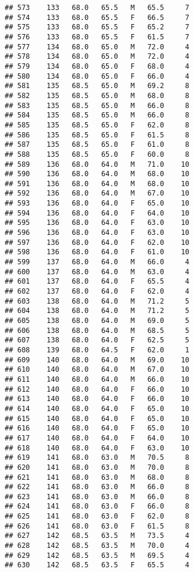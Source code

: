 \documentclass[
]{article}
\begin{document}
\begin{verbatim}
## 573    133   68.0   65.5   M   65.5     7
## 574    133   68.0   65.5   F   66.5     7
## 575    133   68.0   65.5   F   65.2     7
## 576    133   68.0   65.5   F   61.5     7
## 577    134   68.0   65.0   M   72.0     4
## 578    134   68.0   65.0   M   72.0     4
## 579    134   68.0   65.0   F   68.0     4
## 580    134   68.0   65.0   F   66.0     4
## 581    135   68.5   65.0   M   69.2     8
## 582    135   68.5   65.0   M   68.0     8
## 583    135   68.5   65.0   M   66.0     8
## 584    135   68.5   65.0   M   66.0     8
## 585    135   68.5   65.0   F   62.0     8
## 586    135   68.5   65.0   F   61.5     8
## 587    135   68.5   65.0   F   61.0     8
## 588    135   68.5   65.0   F   60.0     8
## 589    136   68.0   64.0   M   71.0    10
## 590    136   68.0   64.0   M   68.0    10
## 591    136   68.0   64.0   M   68.0    10
## 592    136   68.0   64.0   M   67.0    10
## 593    136   68.0   64.0   F   65.0    10
## 594    136   68.0   64.0   F   64.0    10
## 595    136   68.0   64.0   F   63.0    10
## 596    136   68.0   64.0   F   63.0    10
## 597    136   68.0   64.0   F   62.0    10
## 598    136   68.0   64.0   F   61.0    10
## 599    137   68.0   64.0   M   66.0     4
## 600    137   68.0   64.0   M   63.0     4
## 601    137   68.0   64.0   F   65.5     4
## 602    137   68.0   64.0   F   62.0     4
## 603    138   68.0   64.0   M   71.2     5
## 604    138   68.0   64.0   M   71.2     5
## 605    138   68.0   64.0   M   69.0     5
## 606    138   68.0   64.0   M   68.5     5
## 607    138   68.0   64.0   F   62.5     5
## 608    139   68.0   64.5   F   62.0     1
## 609    140   68.0   64.0   M   69.0    10
## 610    140   68.0   64.0   M   67.0    10
## 611    140   68.0   64.0   M   66.0    10
## 612    140   68.0   64.0   F   66.0    10
## 613    140   68.0   64.0   F   66.0    10
## 614    140   68.0   64.0   F   65.0    10
## 615    140   68.0   64.0   F   65.0    10
## 616    140   68.0   64.0   F   65.0    10
## 617    140   68.0   64.0   F   64.0    10
## 618    140   68.0   64.0   F   63.0    10
## 619    141   68.0   63.0   M   70.5     8
## 620    141   68.0   63.0   M   70.0     8
## 621    141   68.0   63.0   M   68.0     8
## 622    141   68.0   63.0   M   66.0     8
## 623    141   68.0   63.0   M   66.0     8
## 624    141   68.0   63.0   F   66.0     8
## 625    141   68.0   63.0   F   62.0     8
## 626    141   68.0   63.0   F   61.5     8
## 627    142   68.5   63.5   M   73.5     4
## 628    142   68.5   63.5   M   70.0     4
## 629    142   68.5   63.5   M   69.5     4
## 630    142   68.5   63.5   F   65.5     4

\end{verbatim}
\end{document}
